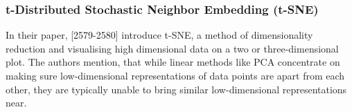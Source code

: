 






\subsubsection{t-Distributed Stochastic Neighbor Embedding (t-SNE)}
\label{section:tSNE}
In their paper, \textcite{maaten2008visualizing}[2579-2580] introduce t-SNE, a method of dimensionality reduction and visualising high dimensional data on a two or three-dimensional plot. The authors mention, that while linear methods like PCA concentrate on making sure low-dimensional representations of data points are apart from each other, they are typically unable to bring similar low-dimensional representations near. 

